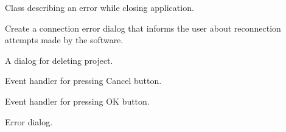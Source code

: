 \documentclass[letterpaper,10pt,english]{sphinxmanual}
\begin{document}

\begin{fulllineitems}
\label{dialogs:dialogs.CloseError}
Class describing an error while closing application.

\end{fulllineitems}


\begin{fulllineitems}
\label{dialogs:dialogs.ConnectionErrorDialog}
Create a connection error dialog that informs the user about reconnection
attempts made by the software.

\end{fulllineitems}


\begin{fulllineitems}
\label{dialogs:dialogs.DeleteProjectDialog}
A dialog for deleting project.

\begin{fulllineitems}
\label{dialogs:dialogs.DeleteProjectDialog.OnCancel}
Event handler for pressing Cancel button.

\end{fulllineitems}


\begin{fulllineitems}
\label{dialogs:dialogs.DeleteProjectDialog.OnOk}
Event handler for pressing OK button.

\end{fulllineitems}


\end{fulllineitems}


\begin{fulllineitems}
\label{dialogs:dialogs.ErrorDialog}
Error dialog.

\end{fulllineitems}
\end{document}
